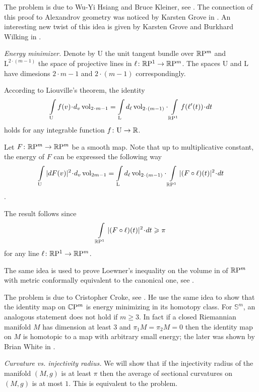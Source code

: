 The problem is due to 
Wu-Yi Hsiang 
and Bruce Kleiner, see \cite{hsiang-kleiner}.
The connection of this proof to Alexandrov geometry was noticed by Karsten Grove in \cite{grove}.
An interesting new twist of this idea 
is given by 
Karsten Grove 
and Burkhard Wilking 
in  \cite{grove-wilking}.

\textit{Energy minimizer.}
Denote by $\mathrm{U}$ the unit tangent bundle over $\mathbb{R}\mathrm{P}^m$
and $\mathrm{L}^{2\cdot(m-1)}$ the space of projective lines in $\ell\colon\mathbb{R}\mathrm{P}^1\to \mathbb{R}\mathrm{P}^m$.
The spaces $\mathrm{U}$ and $\mathrm{L}$ 
have dimesions $2\cdot m-1$ 
and $2\cdot(m-1)$
correspondingly.


According to Liouville's theorem, the identity
\[\int\limits_{\mathrm{U}}f(v)\cdot d_v\vol_{2\cdot m-1}
=
\int\limits_{\mathrm{L}}d_\ell\vol_{2\cdot(m-1)}\cdot\int\limits_{\RP^1} f(\ell'(t))\cdot dt\]
holds for any integrable function $f\colon\mathrm{U}\to\mathbb{R}$.

Let $F\colon\mathbb{R}\mathrm{P}^m\to\mathbb{R}\mathrm{P}^m$ be a smooth map.
Note that up to multiplicative constant,
the energy of $F$ can be expressed the following way
\[\int\limits_{\mathrm{U}} |dF(v)|^2\cdot d_v\vol_{2m-1}
=
\int\limits_{\mathrm{L}}d_\ell\vol_{2\cdot(m-1)}\cdot\int\limits_{\RP^1} |(F\circ \ell)(t)|^2\cdot dt\].

The result follows since
\[\int\limits_{\RP^1} |(F\circ \ell)(t)|^2\cdot dt\ge \pi\]
for any line $\ell\colon\mathbb{R}\mathrm{P}^1\to \mathbb{R}\mathrm{P}^m$.

The same idea is used to prove Loewner's inequality on the volume in of $\mathbb{R}\mathrm{P}^m$ with metric conformally equivalent to the canonical one, see \cite{gromov-filling}.

The problem is due to Cristopher Croke, see \cite{croke-energy}. 
He use the same idea to show that the identity map on $\mathbb{C}\mathrm{P}^m$ is energy minimizing in its homotopy class.
For $\mathbb S^m$, an analogous statement does not hold if $m\ge 3$.
In fact if a closed Riemannian manifold $M$ 
has dimension at least 3 
and $\pi_1M=\pi_2M=0$ 
then the identity map on $M$ is homotopic 
to a map with arbitrary small energy;
the later was shown by Brian White in \cite{white}.



\textit{Curvature vs. injectivity radius.}
We will show that if the injectivity radius of the manifold $(M,g)$ is at least $\pi$
then the average of sectional curvatures on $(M,g)$ is at most $1$.
This is equivalent to the problem.

